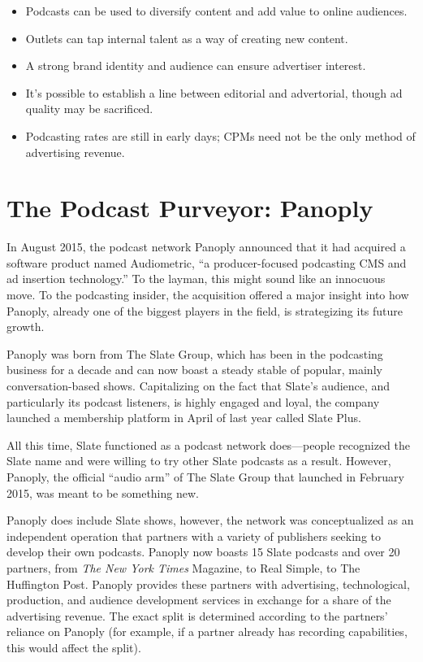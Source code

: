 \documentclass[notoc, symmetric, nobib, nols]{towcenter-guideto-book}
\begin{document}
\begin{itemize}
\item Podcasts can be used to diversify content and add value to online audiences.
\item Outlets can tap internal talent as a way of creating new content.
\item A strong brand identity and audience can ensure advertiser interest.
\item It's possible to establish a line between editorial and advertorial, though ad quality may be sacrificed.
\item Podcasting rates are still in early days; CPMs need not be the only method of advertising revenue.
\end{itemize}

\section{The Podcast Purveyor: Panoply}
 
In August 2015, the podcast network Panoply announced that it had acquired a software product named Audiometric, ``a producer-focused podcasting CMS and ad insertion technology.''\autocite{panoplyaudiometric} To the layman, this might  sound like an innocuous move. To the podcasting insider, the acquisition offered a major insight into how Panoply, already one of the biggest players in the field, is strategizing its future growth.

Panoply was born from The Slate Group, which has been in the podcasting business for a decade and can now boast a steady stable of popular, mainly conversation-based shows. Capitalizing on the fact that Slate's audience, and particularly its podcast listeners, is highly engaged and loyal, the company launched a membership platform in April of last year called Slate Plus.\autocite{bowers} 

All this time, Slate functioned as a podcast network does---people recognized the Slate name and were willing to try other Slate podcasts as a result. However, Panoply, the official ``audio arm'' of The Slate Group that launched in February 2015, was meant to be something new.\autocite{slatepanoply}

Panoply does include Slate shows, however, the network was conceptualized as an independent operation that partners with a variety of publishers seeking to develop their own podcasts. Panoply now boasts 15 Slate podcasts and over 20 partners, from \textit{The New York Times} Magazine, to Real Simple, to The Huffington Post.\autocite{panoplyaudiometric} Panoply provides these partners with advertising, technological, production, and audience development services in exchange for a share of the advertising revenue. The exact split is determined according to the partners' reliance on Panoply (for example, if a partner already has recording capabilities, this would affect the split).\autocite{monaghan} 
\end{document}
